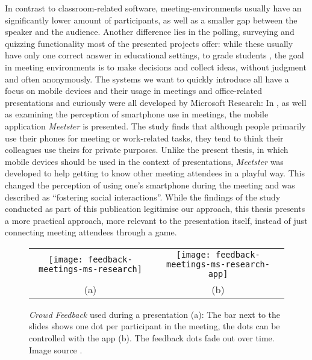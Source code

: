 In contrast to classroom-related software, meeting-en\-vi\-ron\-ments usually have an significantly lower amount of participants, as well as a smaller gap between the speaker and the audience. Another difference lies in the polling, surveying and quizzing functionality most of the presented projects offer: while these usually have only one correct answer in educational settings, to grade students \cite{Lindquist:ExploringMobilePhonesActiveLearning, Triglianos:InteractiveWebPresentationsImpress, Bry:Backstage}, the goal in meeting environments is to make decisions and collect ideas, without judgment and often anonymously.
The systems we want to quickly introduce all have a focus on mobile devices and their usage in meetings and office-related presentations and curiously were all developed by Microsoft Research: In \cite{Bohmer:SmartphoneUseRude}, as well as examining the perception of smartphone use in meetings, the mobile application \emph{Meetster} is presented. The study finds that although people primarily use their phones for meeting or work-related tasks, they tend to think their colleagues use theirs for private purposes. Unlike the present thesis, in which mobile devices should be used in the context of presentations, \emph{Meetster} was developed to help getting to know other meeting attendees in a playful way. This changed the perception of using one's smartphone during the meeting and was described as ``fostering social interactions''. While the findings of the study conducted as part of this publication legitimise our approach, this thesis presents a more practical approach, more relevant to the presentation itself, instead of just connecting meeting attendees through a game.

\begin{figure}
\centering\small
\begin{tabular}{cc}
\texttt{[image: feedback-meetings-ms-research]}
 &
\texttt{[image: feedback-meetings-ms-research-app]} \\
(a) & (b)
\end{tabular}
\caption{\emph{Crowd Feedback} \cite{Teevan:MobileFeedbackDuringPresentation} used during a presentation (a): The bar next to the slides shows one dot per participant in the meeting, the dots can be controlled with the app (b). The feedback dots fade out over time. Image source \cite{Teevan:MobileFeedbackDuringPresentation}.}
\label{fig:related-work-crowd-feedback}
\end{figure}

